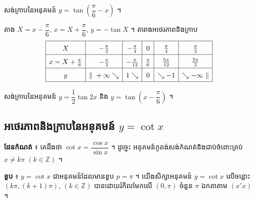 \begin{example}[លំហាត់គំរូ ១២]
សង់ក្រាបនៃអនុគមន៍ $y = \tan\left(\dfrac{\pi}{6} - x\right)$ ។
\end{example}
\ans
តាង $X = x - \dfrac{\pi}{6}$, $x = X + \dfrac{\pi}{6}$, $y = -\tan X$ ។ តារាងអថេរភាពនិងក្រាប
\[
\renewcommand{\arraystretch}{1.6}
\begin{array}{|c|c|c|c|c|c|}\hline
X & -\frac{\pi}{2} & -\frac{\pi}{4} & 0 & \frac{\pi}{4} & \frac{\pi}{2}\\ \hline
x = X + \frac{\pi}{6} & -\frac{\pi}{3} & -\frac{\pi}{12} & \frac{\pi}{6} & \frac{5\pi}{12} & \frac{2\pi}{3}\\ \hline
y & \| \ +\infty \searrow & 1 \searrow & 0 & \searrow -1 & \searrow -\infty \ \|\\ \hline
\end{array}
\]
\begin{center}
\end{center}

\begin{pro}
សង់ក្រាបនៃអនុគមន៍ $y = \dfrac{1}{2}\tan 2x$ និង $y = \tan\left(x - \dfrac{\pi}{6}\right)$ ។
\end{pro}

\subsection{អថេរភាពនិងក្រាបនៃអនុគមន៍ \texorpdfstring{$y = \cot x$}{y = cot x}}

\textbf{ដែនកំណត់} ៖ គេដឹងថា $\cot x = \dfrac{\cos x}{\sin x}$ ។ ដូច្នេះ អនុគមន៍កូតង់សង់កំណត់និងជាប់ចំពោះគ្រប់ $x \ne k\pi$ $(k \in \mathbb{Z})$ ។

\textbf{ខួប} ៖ $y = \cot x$ ជាអនុគមន៍ដែលមានខួប $p = \pi$ ។ យើងសិក្សាអនុគមន៍ $y = \cot x$ លើចន្លោះ $(k\pi, (k + 1)\pi)$, $(k \in \mathbb{Z})$ បានដោយរំកិលមែកលើ $(0, \pi)$ ចំនួន $\pi$ ឯកតាតាម $(x'x)$ ។

